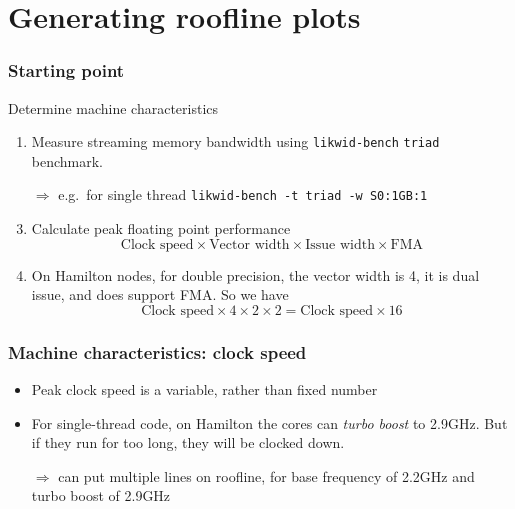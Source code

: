 \documentclass[presentation,aspectratio=43,10pt]{beamer}
\date{}
\begin{document}
\begin{frame}
  \maketitle
\end{frame}

\section{Generating roofline plots}

\begin{frame}
  \frametitle{Starting point}
  \begin{exampleblock}{Determine machine characteristics}
    \begin{enumerate}
    \item Measure streaming memory bandwidth using
      \texttt{likwid-bench} \texttt{triad} benchmark.
    \item[$\Rightarrow$] e.g.~for single thread \texttt{likwid-bench
        -t triad -w S0:1GB:1}
    \item Calculate peak floating point performance
      \begin{equation*}
        \text{Clock speed} \times \text{Vector width} \times
        \text{Issue width} \times \text{FMA}
      \end{equation*}
    \item On Hamilton nodes, for double precision, the vector width is
      4, it is dual issue, and does support FMA. So we have
      \begin{equation*}
        \text{Clock speed} \times 4 \times 2 \times 2 = \text{Clock
          speed} \times 16
      \end{equation*}
    \end{enumerate}
  \end{exampleblock}
\end{frame}
\begin{frame}
  \frametitle{Machine characteristics: clock speed}
  \begin{itemize}
  \item Peak clock speed is a variable, rather than fixed number
  \item For single-thread code, on Hamilton the cores can \emph{turbo
      boost} to 2.9GHz. But if they run for too long, they will be
    clocked down.
  \item[$\Rightarrow$] can put multiple lines on roofline, for base
    frequency of 2.2GHz and turbo boost of 2.9GHz
  \end{itemize}
\end{frame}
\end{document}
